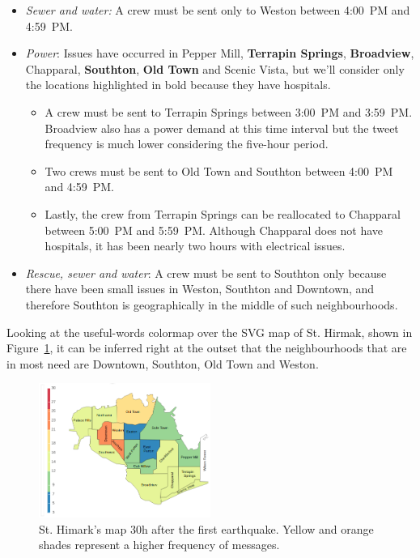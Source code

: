 \begin{itemize}
    \item \emph{Sewer and water:} A crew must be sent only to Weston between 
    4:00~PM and 4:59~PM.
    \smallskip 
    \item \emph{Power}: Issues have occurred in Pepper Mill, \textbf{Terrapin
    Springs}, \textbf{Broadview}, Chapparal, \textbf{Southton}, \textbf{Old 
    Town} and Scenic Vista, but we'll consider only the locations 
    highlighted in bold because they have hospitals.
    \begin{itemize}
        \item A crew must be sent to Terrapin Springs between 3:00~PM and
        3:59~PM. Broadview also has a power demand at this time interval but the
        tweet frequency is much lower considering the five-hour period.
        \item Two crews must be sent to Old Town and Southton between 4:00~PM 
        and 4:59~PM.
        \item Lastly, the crew from Terrapin Springs can be reallocated to
        Chapparal between 5:00~PM and 5:59~PM. Although Chapparal does not have
        hospitals, it has been nearly two hours with electrical issues.
    \end{itemize}
    \item \emph{Rescue, sewer and water}: A crew must be sent to Southton only
    because there have been small issues in Weston, Southton and Downtown, and
    therefore Southton is geographically in the middle of such neighbourhoods.
\end{itemize}

Looking at the useful-words colormap over the SVG map of St. Hirmak, shown in
Figure~\ref{fig:map_30h}, it can be
inferred right at the outset that the neighbourhoods that are in most need are
Downtown, Southton, Old Town and Weston.

\begin{figure}[!h]
    \centering
    \includegraphics[width=0.50\textwidth]{figs/q1/cond_30h/cond_30h_svg.png}
    \caption{St. Himark's map 30h after the first earthquake. Yellow and orange 
    shades represent a higher frequency of messages.}
    \label{fig:map_30h}
\end{figure}

